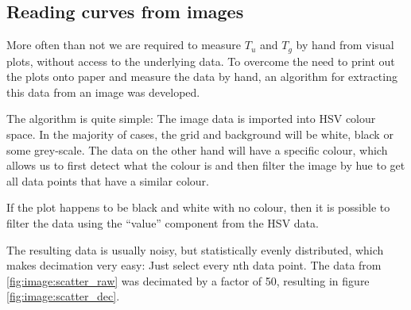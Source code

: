 \subsection{Reading curves from images}

More often than not we are required to measure $T_u$  and  $T_g$  by  hand  from
visual plots, without access to the underlying data. To  overcome  the  need  to
print out the plots onto paper and measure  the  data  by hand, an algorithm for
extracting this data from an image was developed.

The algorithm is quite simple: The image data is imported into HSV colour space.
In  the majority of cases, the grid and background will be white, black or  some
grey-scale. The data on the other hand will have a specific colour, which allows
us to first detect  what  the  colour is and then filter the image by hue to get
all data points that have a similar colour.

If the plot happens to be black and white with no colour, then it is possible to
filter  the  data  using  the   ``value''   component   from   the   HSV   data.

The resulting data is usually noisy, but statistically evenly distributed, which
makes  decimation  very easy: Just select every nth data point.  The  data  from
\ref{fig:image:scatter_raw} was decimated by a factor of 50, resulting in figure
\ref{fig:image:scatter_dec}.

